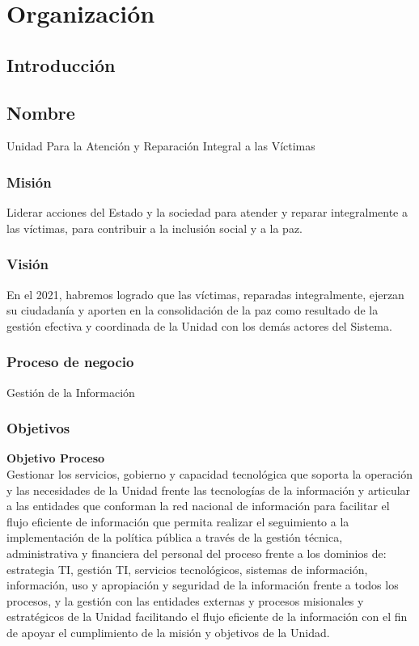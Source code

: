 \chapter{Organización}

\section{Introducción}

\section{Nombre}
Unidad Para la Atención y Reparación Integral a las Víctimas
\subsection{Misión}
Liderar acciones del Estado y la sociedad para atender y reparar integralmente a las víctimas, para contribuir a la inclusión social y a la paz.
\subsection{Visión}
En el 2021, habremos logrado que las víctimas, reparadas integralmente, ejerzan su ciudadanía y aporten en la consolidación de la paz como resultado de la gestión efectiva y coordinada de la Unidad con los demás actores del Sistema.
\newpage
\subsection{Proceso de negocio}
Gestión de la Información
\subsection{Objetivos}
\textbf{Objetivo Proceso}
\\Gestionar los servicios, gobierno y capacidad tecnológica que soporta la operación y las necesidades de la Unidad frente las tecnologías de la información y articular a las entidades que conforman la red nacional de información para facilitar el flujo eficiente de información que permita realizar el seguimiento a la implementación de la política pública a través de la gestión técnica, administrativa y financiera del personal del proceso frente a los dominios de: estrategia TI, gestión TI, servicios tecnológicos, sistemas de información, información, uso y apropiación y seguridad de la información frente a todos los procesos, y la gestión con las entidades externas y procesos misionales y estratégicos de la Unidad facilitando el flujo eficiente de la información con el fin de apoyar el cumplimiento de la misión y objetivos de la Unidad.
\\

